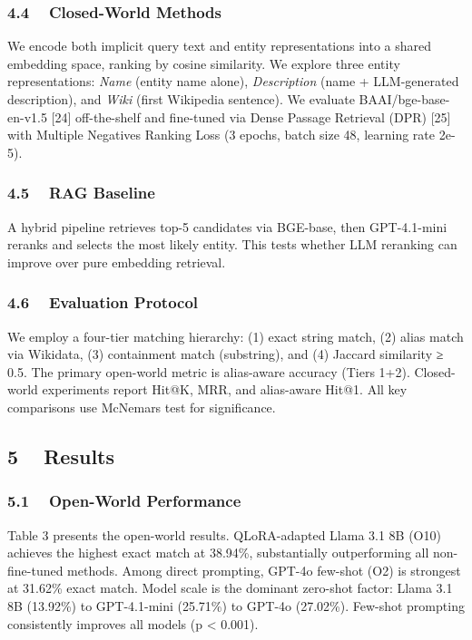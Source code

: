 \documentclass[
]{article}
\begin{document}
\subsubsection{4.4 ~ Closed-World Methods}\label{closed-world-methods}

We encode both implicit query text and entity representations into a
shared embedding space, ranking by cosine similarity. We explore three
entity representations: \emph{Name} (entity name alone),
\emph{Description} (name + LLM-generated description), and \emph{Wiki}
(first Wikipedia sentence). We evaluate BAAI/bge-base-en-v1.5 {[}24{]}
off-the-shelf and fine-tuned via Dense Passage Retrieval (DPR) {[}25{]}
with Multiple Negatives Ranking Loss (3 epochs, batch size 48, learning
rate 2e-5).

\subsubsection{4.5 ~ RAG Baseline}\label{rag-baseline}

A hybrid pipeline retrieves top-5 candidates via BGE-base, then
GPT-4.1-mini reranks and selects the most likely entity. This tests
whether LLM reranking can improve over pure embedding retrieval.

\subsubsection{4.6 ~ Evaluation Protocol}\label{evaluation-protocol}

We employ a four-tier matching hierarchy: (1) exact string match, (2)
alias match via Wikidata, (3) containment match (substring), and (4)
Jaccard similarity ≥ 0.5. The primary open-world metric is alias-aware
accuracy (Tiers 1+2). Closed-world experiments report Hit@K, MRR, and
alias-aware Hit@1. All key comparisons use McNemar\textquotesingle s
test for significance.

\subsection{5 ~ Results}\label{results}

\subsubsection{5.1 ~ Open-World
Performance}\label{open-world-performance}

Table 3 presents the open-world results. QLoRA-adapted Llama 3.1 8B
(O10) achieves the highest exact match at 38.94\%, substantially
outperforming all non-fine-tuned methods. Among direct prompting, GPT-4o
few-shot (O2) is strongest at 31.62\% exact match. Model scale is the
dominant zero-shot factor: Llama 3.1 8B (13.92\%) to GPT-4.1-mini
(25.71\%) to GPT-4o (27.02\%). Few-shot prompting consistently improves
all models (p \textless{} 0.001).
\end{document}
